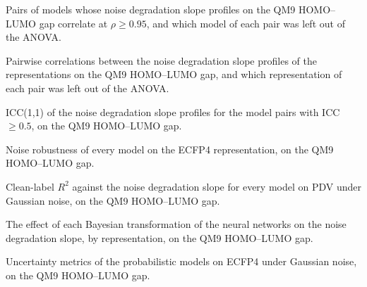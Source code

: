 \label{app:noise:sec:model_redundancy}
Pairs of models whose noise degradation slope profiles on the QM9 HOMO--LUMO gap correlate at $\rho \geq 0.95$, and which model of each pair was left out of the ANOVA.


\label{app:noise:sec:representation_redundancy}
Pairwise correlations between the noise degradation slope profiles of the representations on the QM9 HOMO--LUMO gap, and which representation of each pair was left out of the ANOVA.


\label{app:noise:sec:model_icc}
ICC(1,1) of the noise degradation slope profiles for the model pairs with ICC $\geq 0.5$, on the QM9 HOMO--LUMO gap.


\label{app:noise:sec:ecfp4_overview}
Noise robustness of every model on the ECFP4 representation, on the QM9 HOMO--LUMO gap.


\label{app:noise:sec:clean_r2_vs_robustness}
Clean-label $R^2$ against the noise degradation slope for every model on PDV under Gaussian noise, on the QM9 HOMO--LUMO gap.


\label{app:noise:sec:bayesian_transformation_tests}
The effect of each Bayesian transformation of the neural networks on the noise degradation slope, by representation, on the QM9 HOMO--LUMO gap.


\label{app:noise:sec:uncertainty_metrics_ecfp4}
Uncertainty metrics of the probabilistic models on ECFP4 under Gaussian noise, on the QM9 HOMO--LUMO gap.


